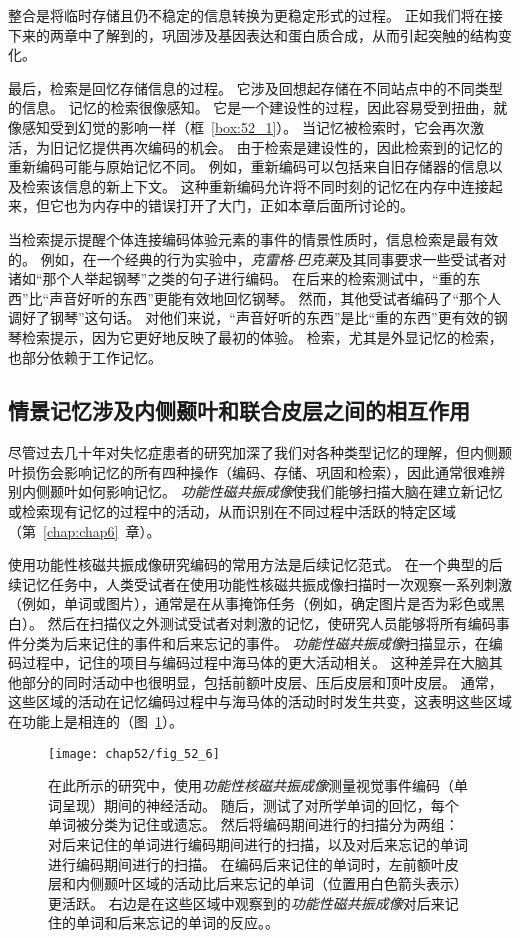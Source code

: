 整合是将临时存储且仍不稳定的信息转换为更稳定形式的过程。
正如我们将在接下来的两章中了解到的，巩固涉及基因表达和蛋白质合成，从而引起突触的结构变化。


最后，检索是回忆存储信息的过程。
它涉及回想起存储在不同站点中的不同类型的信息。
记忆的检索很像感知。
它是一个建设性的过程，因此容易受到扭曲，就像感知受到幻觉的影响一样（框~\ref{box:52_1}）。
当记忆被检索时，它会再次激活，为旧记忆提供再次编码的机会。
由于检索是建设性的，因此检索到的记忆的重新编码可能与原始记忆不同。
例如，重新编码可以包括来自旧存储器的信息以及检索该信息的新上下文。
这种重新编码允许将不同时刻的记忆在内存中连接起来，但它也为内存中的错误打开了大门，正如本章后面所讨论的。


当检索提示提醒个体连接编码体验元素的事件的情景性质时，信息检索是最有效的。
例如，在一个经典的行为实验中，\textit{克雷格$\cdot$巴克莱}及其同事要求一些受试者对诸如“那个人举起钢琴”之类的句子进行编码。
在后来的检索测试中，“重的东西”比“声音好听的东西”更能有效地回忆钢琴。
然而，其他受试者编码了“那个人调好了钢琴”这句话。
对他们来说，“声音好听的东西”是比“重的东西”更有效的钢琴检索提示，因为它更好地反映了最初的体验。
检索，尤其是外显记忆的检索，也部分依赖于工作记忆。



\subsection{情景记忆涉及内侧颞叶和联合皮层之间的相互作用}

尽管过去几十年对失忆症患者的研究加深了我们对各种类型记忆的理解，但内侧颞叶损伤会影响记忆的所有四种操作（编码、存储、巩固和检索），因此通常很难辨别内侧颞叶如何影响记忆。
\textit{功能性磁共振成像}使我们能够扫描大脑在建立新记忆或检索现有记忆的过程中的活动，从而识别在不同过程中活跃的特定区域（第~\ref{chap:chap6}~章）。


使用功能性核磁共振成像研究编码的常用方法是后续记忆范式。
在一个典型的后续记忆任务中，人类受试者在使用功能性核磁共振成像扫描时一次观察一系列刺激（例如，单词或图片），通常是在从事掩饰任务（例如，确定图片是否为彩色或黑白）。
然后在扫描仪之外测试受试者对刺激的记忆，使研究人员能够将所有编码事件分类为后来记住的事件和后来忘记的事件。
\textit{功能性磁共振成像}扫描显示，在编码过程中，记住的项目与编码过程中海马体的更大活动相关。
这种差异在大脑其他部分的同时活动中也很明显，包括前额叶皮层、压后皮层和顶叶皮层。
通常，这些区域的活动在记忆编码过程中与海马体的活动时时发生共变，这表明这些区域在功能上是相连的（图~\ref{fig:52_6}）。


\begin{figure}[htbp]
	\centering
	\texttt{[image: chap52/fig\_52\_6]}
	\caption{在此所示的研究中，使用\textit{功能性核磁共振成像}测量视觉事件编码（单词呈现）期间的神经活动。
		随后，测试了对所学单词的回忆，每个单词被分类为记住或遗忘。
		然后将编码期间进行的扫描分为两组：对后来记住的单词进行编码期间进行的扫描，以及对后来忘记的单词进行编码期间进行的扫描。
		在编码后来记住的单词时，左前额叶皮层和内侧颞叶区域的活动比后来忘记的单词（位置用白色箭头表示）更活跃。
		右边是在这些区域中观察到的\textit{功能性磁共振成像}对后来记住的单词和后来忘记的单词的反应。\cite{wagner1998building}。}
	\label{fig:52_6}
\end{figure}


